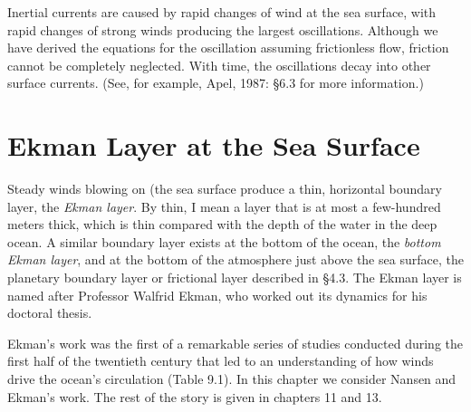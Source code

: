 Inertial currents are caused by rapid changes of wind at the sea
surface, with rapid changes of strong winds producing the largest
oscillations. Although we have derived the equations for the
oscillation assuming frictionless flow, friction cannot be completely
neglected. With time, the oscillations decay into other surface
currents. (See, for example, Apel, 1987: \S6.3 for more information.)

\section{Ekman Layer at the Sea Surface}
Steady winds blowing on (the sea surface produce a thin, horizontal boundary
layer, the \textit{Ekman layer}.  By
thin, I mean a layer that is at most a few-hundred meters thick, which
is thin compared with the depth of the water in the deep ocean. A
similar boundary layer exists at the bottom of the ocean, the
\textit{bottom Ekman layer}, and at
the bottom of the atmosphere just above the sea surface, the planetary
boundary layer or frictional layer described in \S 4.3. The Ekman
layer is named after Professor Walfrid Ekman, who worked out its
dynamics for his doctoral thesis.

Ekman's work was the first of a remarkable series of studies conducted
during the first half of the twentieth century that led to an
understanding of how winds drive the ocean's circulation (Table
9.1). In this chapter we consider Nansen and Ekman's work. The rest of
the story is given in chapters 11 and 13.

